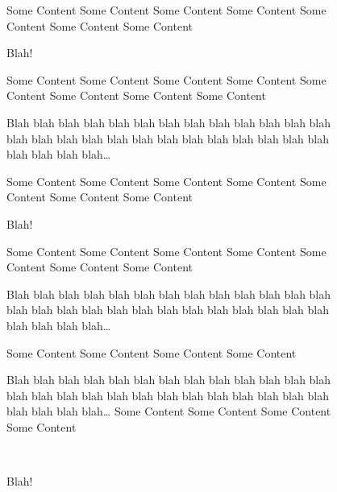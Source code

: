 \documentclass{article}
\begin{document}
\begin{figure}
Some Content
Some Content
Some Content
Some Content
Some Content
Some Content
Some Content
\caption{Blah!}
\end{figure}

\begin{figure}
Some Content
Some Content
Some Content
Some Content
Some Content
Some Content
Some Content
Some Content
\caption{Blah blah blah blah blah blah blah blah blah blah blah
 blah blah blah blah blah blah blah blah blah blah blah blah blah
 blah blah blah blah blah blah\ldots}
\end{figure}

\captionsetup{boxsep=0.2cm,margin=0.2cm,slc=off}
\captionsetup[sub]{slc=on}

\begin{figure}
Some Content
Some Content
Some Content
Some Content
Some Content
Some Content
Some Content
\caption{Blah!}
\end{figure}

\begin{figure}
Some Content
Some Content
Some Content
Some Content
Some Content
Some Content
Some Content
\caption{Blah blah blah blah blah blah blah blah blah blah blah
 blah blah blah blah blah blah blah blah blah blah blah blah blah
 blah blah blah blah blah blah\ldots}
\end{figure}

\begin{figure}
\centering
{}
{Some Content
Some Content
Some Content
Some Content}
\end{figure}

\begin{figure}
\centering
\captionbox
{Blah blah blah blah blah blah blah blah blah blah blah
 blah blah blah blah blah blah blah blah blah blah blah blah blah
 blah blah blah blah blah blah\ldots}
{Some Content
Some Content
Some Content
Some Content}
\end{figure}

\clearpage
\captionsetup[sub]{box=colorbox,boxcolor=gray}

\begin{figure}
\centering
{}
\\[2ex]
\caption{Blah!}
\end{figure}
\end{document}
